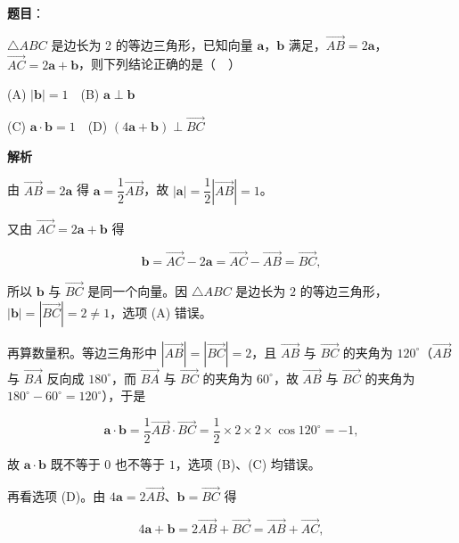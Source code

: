 \begin{answer}

\textbf{题目}：

\(\triangle ABC\) 是边长为 2 的等边三角形，已知向量 \(\boldsymbol{a}\)，\(\boldsymbol{b}\) 满足，\(\overrightarrow{AB}=2\boldsymbol{a}\)，\(\overrightarrow{AC}=2\boldsymbol{a}+\boldsymbol{b}\)，则下列结论正确的是（　）

(A) \(|\boldsymbol{b}|=1\)　(B) \(\boldsymbol{a}\perp\boldsymbol{b}\)

(C) \(\boldsymbol{a}\cdot\boldsymbol{b}=1\)　(D) \((4\boldsymbol{a}+\boldsymbol{b})\perp\overrightarrow{BC}\)

\textbf{解析}

由 \(\overrightarrow{AB}=2\boldsymbol{a}\) 得 \(\boldsymbol{a}=\dfrac{1}{2}\overrightarrow{AB}\)，故 \(|\boldsymbol{a}|=\dfrac{1}{2}|\overrightarrow{AB}|=1\)。

又由 \(\overrightarrow{AC}=2\boldsymbol{a}+\boldsymbol{b}\) 得

\nopagebreak[4]
\[ \boldsymbol{b}=\overrightarrow{AC}-2\boldsymbol{a}=\overrightarrow{AC}-\overrightarrow{AB}=\overrightarrow{BC}, \]

所以 \(\boldsymbol{b}\) 与 \(\overrightarrow{BC}\) 是同一个向量。因 \(\triangle ABC\) 是边长为 \(2\) 的等边三角形，\(|\boldsymbol{b}|=|\overrightarrow{BC}|=2\neq1\)，选项 (A) 错误。

再算数量积。等边三角形中 \(|\overrightarrow{AB}|=|\overrightarrow{BC}|=2\)，且 \(\overrightarrow{AB}\) 与 \(\overrightarrow{BC}\) 的夹角为 \(120^\circ\)（\(\overrightarrow{AB}\) 与 \(\overrightarrow{BA}\) 反向成 \(180^\circ\)，而 \(\overrightarrow{BA}\) 与 \(\overrightarrow{BC}\) 的夹角为 \(60^\circ\)，故 \(\overrightarrow{AB}\) 与 \(\overrightarrow{BC}\) 的夹角为 \(180^\circ-60^\circ=120^\circ\)），于是

\nopagebreak[4]
\[ \boldsymbol{a}\cdot\boldsymbol{b}=\dfrac{1}{2}\overrightarrow{AB}\cdot\overrightarrow{BC}=\dfrac{1}{2}\times2\times2\times\cos120^\circ=-1, \]

故 \(\boldsymbol{a}\cdot\boldsymbol{b}\) 既不等于 \(0\) 也不等于 \(1\)，选项 (B)、(C) 均错误。

再看选项 (D)。由 \(4\boldsymbol{a}=2\overrightarrow{AB}\)、\(\boldsymbol{b}=\overrightarrow{BC}\) 得

\nopagebreak[4]
\[ 4\boldsymbol{a}+\boldsymbol{b}=2\overrightarrow{AB}+\overrightarrow{BC}=\overrightarrow{AB}+\overrightarrow{AC}, \]


\end{answer}
